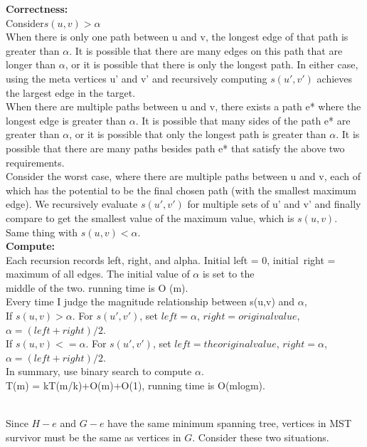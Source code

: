 \documentclass[12pt,a4paper]{article}
\newcommand{\question}[1]{\bigskip\noindent{\textbf{Q{#1} solution}}}
\begin{document}
\question{28.C}
\textbf{Correctness:}\\
Consider$ s(u,v)> \alpha$\\
When there is only one path between u and v, the longest edge of that path is greater than $\alpha$. It is possible that there are many edges on this path that are longer than $\alpha$, or it is possible that there is only the longest path. In either case, using the meta vertices u' and v' and recursively computing $s(u',v')$ achieves the largest edge in the target.\\
When there are multiple paths between u and v, there exists a path e* where the longest edge is greater than $\alpha$. It is possible that many sides of the path e* are greater than $\alpha$, or it is possible that only the longest path is greater than $\alpha$. It is possible that there are many paths besides path e* that satisfy the above two requirements.\\
Consider the worst case, where there are multiple paths between u and v, each of which has the potential to be the final chosen path (with the smallest maximum edge). We recursively evaluate $s(u',v')$ for multiple sets of u' and v' and finally compare to get the smallest value of the maximum value, which is $s(u,v)$.\\
Same thing with $s(u,v)< \alpha$.\\

\noindent
\textbf{Compute:}\\
Each recursion records left, right, and alpha. Initial left = 0, initial\ right = maximum of all edges. The initial value of $\alpha$ is set to the\\ middle of the two. running time is O (m).\\
Every time I judge the magnitude relationship between s(u,v) and $\alpha$,\\
If $s(u,v)> \alpha$. For $s(u',v')$, set $left = \alpha$, $right = original value$, $\alpha = (left+right)/2$.\\
If $s(u,v)<=\alpha$. For $s(u',v')$, set $left = the original value$, $right =\alpha$, $\alpha = (left+right)/2$.\\
In summary, use binary search to compute $\alpha$.\\
T(m) = kT(m/k)+O(m)+O(1), running time is O(mlogm).\\\\
\question{29.A}

Since $H - e$ and $G - e$ have the same minimum spanning tree, vertices in MST survivor must be the same as vertices in $G$. Consider these two situations.  
\end{document}
